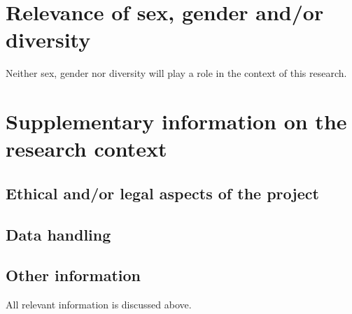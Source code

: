 \documentclass{scrartcl}
\begin{document}
\printbibliography[heading=none]

\section{Relevance of sex, gender and/or diversity}

Neither sex, gender nor diversity will play a role in the context of this research. 

\pagebreak

\section{Supplementary information on the research context}

\subsection{Ethical and/or legal aspects of the project}


\subsection{Data handling}


\subsection{Other information}

All relevant information is discussed above. 
\end{document}
